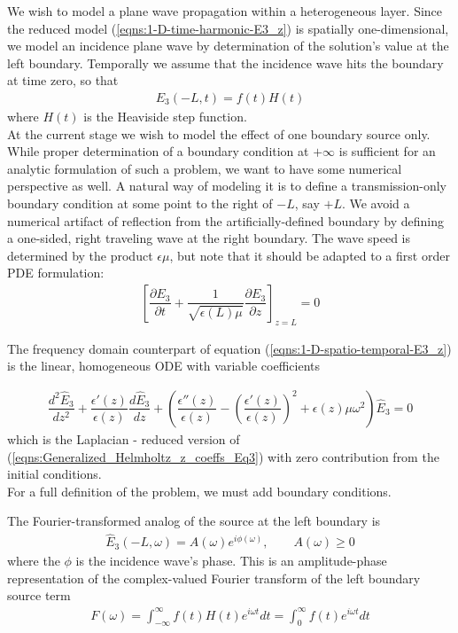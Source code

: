 \documentclass[12pt,twoside]{report}
\begin{document}
We wish to model a plane wave propagation within a heterogeneous layer. Since the reduced model (\ref{eqns:1-D-time-harmonic-E3_z}) is spatially one-dimensional, we model an incidence plane wave by determination of the solution's value at the left boundary. Temporally we assume that the incidence wave hits the boundary at time zero, so that
\begin{align}
\label{eqns:1-D-temporal-source-BC-E3_z}
E_3(-L,t) = f(t)H(t)
\end{align}
where $H(t)$ is the Heaviside step function. \\
At the current stage we wish to model the effect of one boundary source only. While proper determination of a boundary condition at $+\infty$ is sufficient for an analytic formulation of such a problem, we want to have some numerical perspective as well. A natural way of modeling it is to define a transmission-only boundary condition at some point to the right of $-L$, say $+L$. We avoid a numerical artifact of reflection from the artificially-defined boundary  by defining a one-sided, right traveling wave at the right boundary. The wave speed is determined by the product $\epsilon \mu$, but note that it should be adapted to a first order PDE formulation:
\begin{align}
\label{eqns:1_D-temporal-traveling-wave-bc}
\left[\dfrac{\partial E_3}{\partial t} +  \dfrac{1}{\sqrt{\epsilon(L)\mu}}\dfrac{\partial E_3}{\partial z} \right ]_{z=L} = 0
\end{align}



The frequency domain counterpart of equation (\ref{eqns:1-D-spatio-temporal-E3_z}) is the linear, homogeneous ODE with variable coefficients

\begin{align}
\label{eqns:1-D-time-harmonic-E3_z}
\dfrac{d^2 \hat{E}_3}{d z^2} + \dfrac{\epsilon'(z)}{\epsilon(z)}\dfrac{d \hat{E}_3}{d z} + \left( \dfrac{\epsilon''(z)}{\epsilon(z)}-\left( \dfrac{\epsilon'(z)}{\epsilon(z)}\right)^2 + \epsilon(z) \mu \omega^2\right)\hat{E}_3 = 0
\end{align}
which is the Laplacian - reduced version of (\ref{eqns:Generalized_Helmholtz_z_coeffs_Eq3}) with zero contribution from the initial conditions.\\
 
For a full definition of the problem, we must add boundary conditions. 


 The Fourier-transformed analog of the source at the left boundary is 
\begin{align}
\hat{E}_3(-L,\omega) = A(\omega) e^{i \phi(\omega)}, \qquad A(\omega)\geq 0 
\label{eqns:1-D-time-harmonic-z-boundary-source}
\end{align}
where the $\phi$ is the incidence wave's phase. This is an amplitude-phase representation of the complex-valued Fourier transform of the left boundary source term
\begin{align}
F(\omega) = \int_{-\infty}^\infty f(t)H(t)e^{i \omega t}dt = \int_0^\infty f(t)e^{i\omega t}dt
\end{align}
\end{document}
